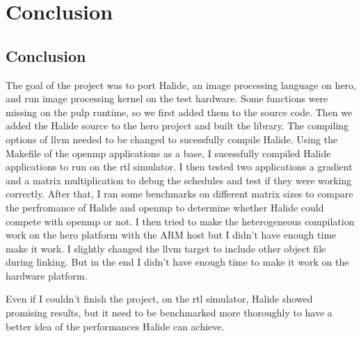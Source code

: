
\chapter{Conclusion}


\section{Conclusion}
The goal of the project was to port Halide, an image processing language on \gls{hero}, and run image processing kernel on the test hardware.
Some functions were missing on the \gls{pulp} runtime, so we first added them to the source code. 
Then we added the Halide source to the \gls{hero} project and built the library. The compiling options of \gls{llvm} needed to be changed to sucessfully compile Halide.
Using the Makefile of the \gls{openmp} applications as a base, I sucessfully compiled Halide applications to run on the \gls{rtl} simulator.
I then tested two applications a gradient and a matrix multiplication to debug the schedules and test if they were working correctly.
After that, I ran some benchmarks on different matrix sizes to compare the perfromance of Halide and \gls{openmp} to determine whether Halide could compete with \gls{openmp} or not.
I then tried to make the heterogeneous compilation work on the \gls{hero} platform with the ARM host but I didn't have enough time make it work. I slightly changed the \gls{llvm} target to include other object file during linking. But in the end I didn't have enough time to make it work on the hardware platform.

Even if I couldn't finish the project, on the \gls{rtl} simulator, Halide showed promising results, but it need to be benchmarked more thoroughly to have a better idea of the performances Halide can achieve.

